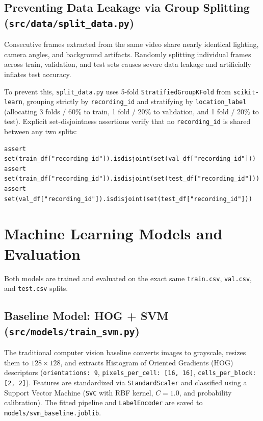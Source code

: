 \documentclass[10pt,a4paper]{article}
\begin{document}
\subsection{Preventing Data Leakage via Group Splitting (\texttt{src/data/split\_data.py})}
Consecutive frames extracted from the same video share nearly identical lighting, camera angles, and background artifacts. Randomly splitting individual frames across train, validation, and test sets causes severe data leakage and artificially inflates test accuracy.

To prevent this, \texttt{split\_data.py} uses 5-fold \texttt{StratifiedGroupKFold} from \texttt{scikit-learn}, grouping strictly by \texttt{recording\_id} and stratifying by \texttt{location\_label} (allocating 3 folds / 60\% to train, 1 fold / 20\% to validation, and 1 fold / 20\% to test). Explicit set-disjointness assertions verify that no \texttt{recording\_id} is shared between any two splits:
\begin{verbatim}
assert set(train_df["recording_id"]).isdisjoint(set(val_df["recording_id"]))
assert set(train_df["recording_id"]).isdisjoint(set(test_df["recording_id"]))
assert set(val_df["recording_id"]).isdisjoint(set(test_df["recording_id"]))
\end{verbatim}

\section{Machine Learning Models and Evaluation}
Both models are trained and evaluated on the exact same \texttt{train.csv}, \texttt{val.csv}, and \texttt{test.csv} splits.

\subsection{Baseline Model: HOG + SVM (\texttt{src/models/train\_svm.py})}
The traditional computer vision baseline converts images to grayscale, resizes them to $128 \times 128$, and extracts Histogram of Oriented Gradients (HOG) descriptors (\texttt{orientations: 9}, \texttt{pixels\_per\_cell: [16, 16]}, \texttt{cells\_per\_block: [2, 2]}). Features are standardized via \texttt{StandardScaler} and classified using a Support Vector Machine (\texttt{SVC} with RBF kernel, $C = 1.0$, and probability calibration). The fitted pipeline and \texttt{LabelEncoder} are saved to \texttt{models/svm\_baseline.joblib}.
\end{document}
